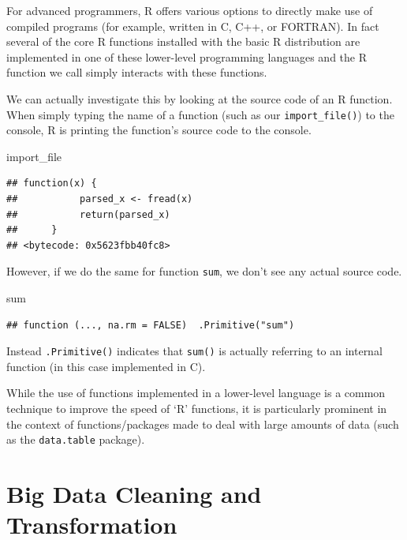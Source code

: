 \documentclass[
  12pt,
]{style/krantz}
\newenvironment{Shaded}{\begin{snugshade}}{\end{snugshade}}
\newcommand{\NormalTok}[1]{#1}
\begin{document}
For advanced programmers, R offers various options to directly make use of compiled programs (for example, written in C, C++, or FORTRAN). In fact several of the core R functions installed with the basic R distribution are implemented in one of these lower-level programming languages and the R function we call simply interacts with these functions.

We can actually investigate this by looking at the source code of an R function. When simply typing the name of a function (such as our \texttt{import\_file()}) to the console, R is printing the function's source code to the console.

\begin{Shaded}
\begin{Highlighting}[]
\NormalTok{import\_file}
\end{Highlighting}
\end{Shaded}

\begin{verbatim}
## function(x) {
##           parsed_x <- fread(x)
##           return(parsed_x)
##      }
## <bytecode: 0x5623fbb40fc8>
\end{verbatim}

However, if we do the same for function \texttt{sum}, we don't see any actual source code.

\begin{Shaded}
\begin{Highlighting}[]
\NormalTok{sum}
\end{Highlighting}
\end{Shaded}

\begin{verbatim}
## function (..., na.rm = FALSE)  .Primitive("sum")
\end{verbatim}

Instead \texttt{.Primitive()} indicates that \texttt{sum()} is actually referring to an internal function (in this case implemented in C).

While the use of functions implemented in a lower-level language is a common technique to improve the speed of `R' functions, it is particularly prominent in the context of functions/packages made to deal with large amounts of data (such as the \texttt{data.table} package).

\hypertarget{big-data-cleaning-and-transformation}{%
\chapter{Big Data Cleaning and Transformation}\label{big-data-cleaning-and-transformation}}
\end{document}
